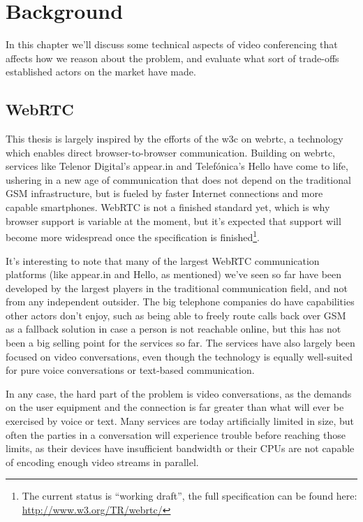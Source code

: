 \chapter{Background}
\label{chp:background}

In this chapter we'll discuss some technical aspects of video conferencing that affects how we reason about the problem, and evaluate what sort of trade-offs established actors on the market have made.

\section{WebRTC}

This thesis is largely inspired by the efforts of the \gls{w3c} on \gls{webrtc}, a technology which enables direct browser-to-browser communication. Building on \gls{webrtc}, services like Telenor Digital's appear.in and Telefónica's Hello have come to life, ushering in a new age of communication that does not depend on the traditional GSM infrastructure, but is fueled by faster Internet connections and more capable smartphones. WebRTC is not a finished standard yet, which is why browser support is variable at the moment, but it's expected that support will become more widespread once the specification is finished\footnote{The current status is ``working draft'', the full specification can be found here: \url{http://www.w3.org/TR/webrtc/}}.

It's interesting to note that many of the largest WebRTC communication platforms (like appear.in and Hello, as mentioned) we've seen so far have been developed by the largest players in the traditional communication field, and not from any independent outsider. The big telephone companies do have capabilities other actors don't enjoy, such as being able to freely route calls back over GSM as a fallback solution in case a person is not reachable online, but this has not been a big selling point for the services so far. The services have also largely been focused on video conversations, even though the technology is equally well-suited for pure voice conversations or text-based communication.

In any case, the hard part of the problem is video conversations, as the demands on the user equipment and the connection is far greater than what will ever be exercised by voice or text. Many services are today artificially limited in size, but often the parties in a conversation will experience trouble before reaching those limits, as their devices have insufficient bandwidth or their CPUs are not capable of encoding enough video streams in parallel.

